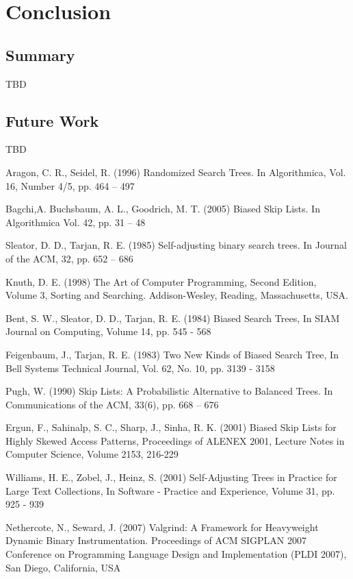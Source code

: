 \documentclass[mcs]{scsthesis}
\begin{document}
\chapter{Conclusion}

\section{Summary}

TBD

\section{Future Work}

TBD

\begin{thebibliography}{5}

Aragon, C. R.,  Seidel, R. (1996) Randomized Search Trees.
In Algorithmica, Vol. 16, Number 4/5, pp. 464 – 497

Bagchi,A. Buchsbaum, A. L., Goodrich, M. T. (2005) Biased Skip Lists.
In Algorithmica Vol. 42, pp. 31 – 48
 
Sleator, D. D., Tarjan, R. E. (1985) Self-adjusting binary search trees.
In Journal of the ACM, 32, pp. 652 – 686

Knuth, D. E. (1998) The Art of Computer Programming, Second Edition,
Volume 3, Sorting and Searching.  Addison-Wesley, Reading, Massachusetts, USA.

Bent, S. W., Sleator, D. D., Tarjan, R. E. (1984) Biased Search Trees,
In SIAM Journal on Computing, Volume 14, pp. 545 - 568

Feigenbaum, J., Tarjan, R. E. (1983) Two New Kinds of Biased Search Tree,
In Bell Systems Technical Journal, Vol. 62, No. 10, pp. 3139 - 3158

Pugh, W. (1990) Skip Lists: A Probabilistic Alternative to Balanced Trees.
In Communications of the ACM, 33(6), pp. 668 – 676

Ergun, F., Sahinalp, S. C., Sharp, J., Sinha, R. K. (2001) Biased Skip Lists
for Highly Skewed Access Patterns, Proceedings of ALENEX 2001, Lecture Notes in
Computer Science, Volume 2153, 216-229

Williams, H. E., Zobel, J., Heinz, S. (2001) Self-Adjusting Trees in Practice
for Large Text Collections, In Software - Practice and Experience,
Volume 31, pp. 925 - 939

Nethercote, N., Seward, J. (2007) Valgrind: A Framework for Heavyweight Dynamic
Binary Instrumentation.  Proceedings of ACM SIGPLAN 2007 Conference on
Programming Language Design and Implementation (PLDI 2007),
San Diego, California, USA

\end{thebibliography}
\end{document}

